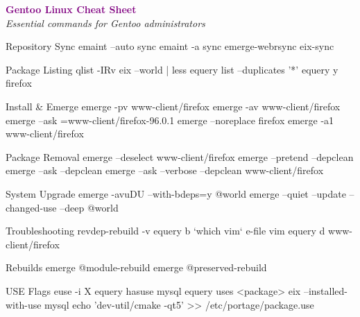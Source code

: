 \documentclass[10pt]{article}
\begin{document}
\pagestyle{empty}
\begin{center}
	 \hspace{1em}
	{\Huge\textbf{\textcolor{purple}{Gentoo Linux Cheat Sheet}}}
	\hspace{1em} \\
	\vspace{5pt}
	{\small\textit{Essential commands for Gentoo administrators}}
\end{center}

\begin{multicols}{2}

\begin{cheatbox}{Repository Sync}
emaint --auto sync
emaint -a sync
emerge-webrsync
eix-sync
\end{cheatbox}

\begin{cheatbox}{Package Listing}
qlist -IRv
eix --world | less
equery list --duplicates '*'
equery y firefox
\end{cheatbox}

\begin{cheatbox}{Install \& Emerge}
emerge -pv www-client/firefox
emerge -av www-client/firefox
emerge --ask =www-client/firefox-96.0.1
emerge --noreplace firefox
emerge -a1 www-client/firefox
\end{cheatbox}

\begin{cheatbox}{Package Removal}
emerge --deselect www-client/firefox
emerge --pretend --depclean
emerge --ask --depclean
emerge --ask --verbose --depclean www-client/firefox
\end{cheatbox}

\begin{cheatbox}{System Upgrade}
emerge -avuDU --with-bdeps=y @world
emerge --quiet --update --changed-use --deep @world
\end{cheatbox}

\begin{cheatbox}{Troubleshooting}
revdep-rebuild -v
equery b `which vim`
e-file vim
equery d www-client/firefox
\end{cheatbox}

\begin{cheatbox}{Rebuilds}
emerge @module-rebuild
emerge @preserved-rebuild
\end{cheatbox}

\begin{cheatbox}{USE Flags}
euse -i X
equery hasuse mysql
equery uses <package>
eix --installed-with-use mysql
echo 'dev-util/cmake -qt5' >> /etc/portage/package.use
\end{cheatbox}


\end{multicols}
\end{document}
